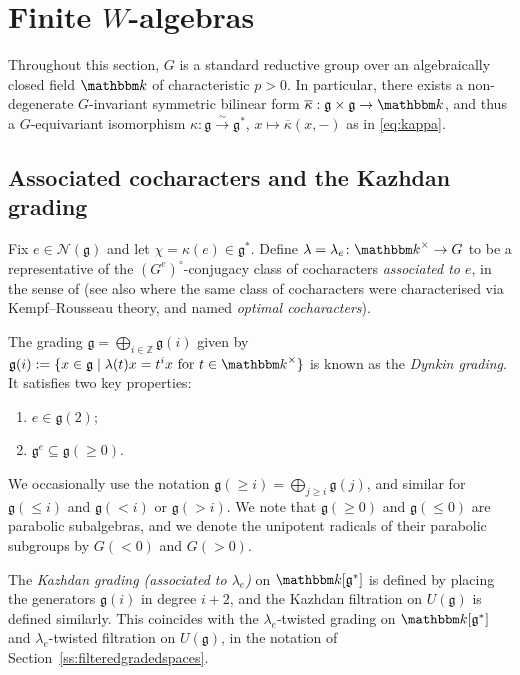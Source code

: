 \documentclass[twoside,12pt,reqno]{amsart}
\theoremstyle{remark}
\numberwithin{equation}{section}
\def\k{{\mathbbm k}}
\def\o{\overline}
\def\Z{{\mathbb Z}}
\def\g{{\mathfrak g}}
\newcommand{\Nc}{\mathcal{N}}
\begin{document}
  

 
 \section{Finite $W$-algebras}
 \label{S:Walgebrassmallmodules}
Throughout this section, $G$ is a standard reductive group over an algebraically closed field $\k$ of characteristic $p>0$. In particular, there exists a non-degenerate $G$-invariant symmetric bilinear form $\o{\kappa}:\g\times\g\to\k$, and thus a $G$-equivariant isomorphism $\kappa \colon \g\xrightarrow{\sim} \g^*$, $x\mapsto \o\kappa(x,-)$ as in \eqref{eq:kappa}.

\subsection{Associated cocharacters and the Kazhdan grading}
\label{ss:asscochar}



Fix $e\in \Nc(\g)$ and let $\chi = \kappa(e) \in \g^*$. Define $\lambda = \lambda_e \colon \k^\times \to G$ to be a representative of the $(G^e)^\circ$-conjugacy class of cocharacters {\it associated to $e$}, in the sense of \cite[]{JaNO} (see also \cite{PrKR} where the same class of cocharacters were characterised via Kempf--Rousseau theory, and named {\it optimal cocharacters}).

The grading $\g = \bigoplus_{i\in \Z} \g(i)$ given by $\g(i) := \{ x\in \g \mid \lambda(t)x = t^i x \text{ for } t\in \k^\times\}$ is known as the {\it Dynkin grading}. It satisfies two key properties:
\begin{enumerate}
\item $e \in \g(2)$;
\item $\g^e \subseteq \g(\ge 0)$.
\end{enumerate}

We occasionally use the notation $\g(\ge \! i) = \bigoplus_{j\ge i} \g(j)$, and similar for $\g(\le i)$ and $\g(<\!i)$ or $\g(>\!i)$. We note that $\g(\ge \! 0)$ and $\g(\le \!0)$ are parabolic subalgebras, and we denote the unipotent radicals of their parabolic subgroups by $G(< \!0)$ and $G(>\!0)$.


The {\it Kazhdan grading (associated to $\lambda_e$)} on $\k[\g^*]$ is defined by placing the generators $\g(i)$ in degree $i+2$, and the Kazhdan filtration on $U(\g)$ is defined similarly. This coincides with the $\lambda_e$-twisted grading on $\k[\g^*]$ and $\lambda_e$-twisted filtration on $U(\g)$, in the notation of Section~\ref{ss:filteredgradedspaces}.
\end{document}
